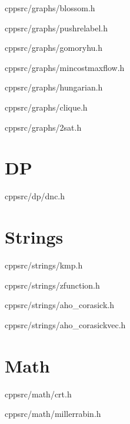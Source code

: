 \documentclass[portrait, 8pt, a4paper, oneside, twocolumn]{extarticle}
\begin{document}
    {}
    {}
    {cpp}{src/graphs/blossom.h}
    \noindent\hrulefill

    {}
    {}
    {cpp}{src/graphs/pushrelabel.h}
    \noindent\hrulefill

    {}
    {}
    {cpp}{src/graphs/gomoryhu.h}
    \noindent\hrulefill

    {}
    {}
    {cpp}{src/graphs/mincostmaxflow.h}
    \noindent\hrulefill

    {}
    {}
    {cpp}{src/graphs/hungarian.h}
    \noindent\hrulefill

    {}
    {}
    {cpp}{src/graphs/clique.h}
    \noindent\hrulefill

    {}
    {}
    {cpp}{src/graphs/2sat.h}
    \noindent\hrulefill

\section{DP}
    {}
    {}
    {cpp}{src/dp/dnc.h}
    \noindent\hrulefill
	
\section{Strings}
	
    {}
    {}
    {cpp}{src/strings/kmp.h}
    \noindent\hrulefill

    {}
    {}
    {cpp}{src/strings/zfunction.h}
    \noindent\hrulefill

    {}
    {}
    {cpp}{src/strings/aho_corasick.h}
    \noindent\hrulefill

    {}
    {}
    {cpp}{src/strings/aho_corasickvec.h}
    \noindent\hrulefill

    
\section{Math}

    {}
    {}
    {cpp}{src/math/crt.h}
    \noindent\hrulefill

    {}
    {}
    {cpp}{src/math/millerrabin.h}
    \noindent\hrulefill
\end{document}
